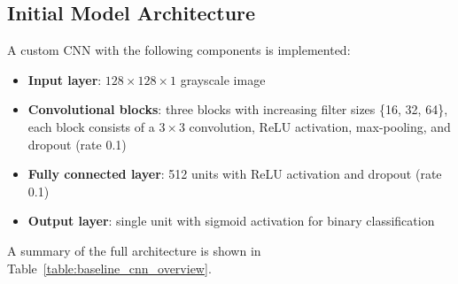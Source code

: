 \documentclass[conference]{IEEEtran}
\begin{document}
\subsection{Initial Model Architecture}
A custom CNN with the following components is implemented:
\begin{itemize}
	\item \textbf{Input layer}: $128\times128\times1$ grayscale image
	\item \textbf{Convolutional blocks}: three blocks with increasing filter sizes \{16, 32, 64\}, each block consists of a $3\times3$ convolution, ReLU activation, max-pooling, and dropout (rate 0.1)
	\item \textbf{Fully connected layer}: 512 units with ReLU activation and dropout (rate 0.1)
	\item \textbf{Output layer}: single unit with sigmoid activation for binary classification
\end{itemize}
\vspace{0.5cm}

A summary of the full architecture is shown in Table~\ref{table:baseline_cnn_overview}.
\end{document}
